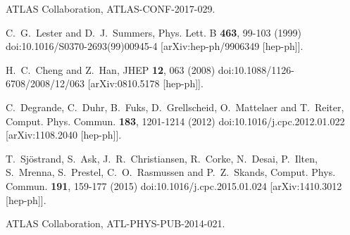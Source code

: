 \documentclass{ws-mpla}
\begin{document}
\begin{thebibliography}{99}
  ATLAS Collaboration,
  ATLAS-CONF-2017-029.

  C.~G.~Lester and D.~J.~Summers,
  Phys. Lett. B \textbf{463}, 99-103 (1999)
  doi:10.1016/S0370-2693(99)00945-4
  [arXiv:hep-ph/9906349 [hep-ph]].

  H.~C.~Cheng and Z.~Han,
  JHEP \textbf{12}, 063 (2008)
  doi:10.1088/1126-6708/2008/12/063
  [arXiv:0810.5178 [hep-ph]].
 
  C.~Degrande, C.~Duhr, B.~Fuks, D.~Grellscheid, O.~Mattelaer and T.~Reiter,
  Comput. Phys. Commun. \textbf{183}, 1201-1214 (2012)
  doi:10.1016/j.cpc.2012.01.022
  [arXiv:1108.2040 [hep-ph]].

  T.~Sj\"ostrand, S.~Ask, J.~R.~Christiansen, R.~Corke, N.~Desai, P.~Ilten, S.~Mrenna, S.~Prestel, C.~O.~Rasmussen and P.~Z.~Skands,
  Comput. Phys. Commun. \textbf{191}, 159-177 (2015)
  doi:10.1016/j.cpc.2015.01.024
  [arXiv:1410.3012 [hep-ph]].

  ATLAS Collaboration,
  ATL-PHYS-PUB-2014-021.
\end{thebibliography}
\end{document}
